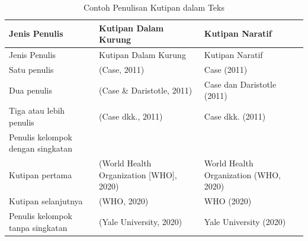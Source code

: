 \documentclass[
  indonesian,
  letterpaper,
]{scrbook}
\begin{document}
\begin{longtable}[]{@{}
  >{\raggedright\arraybackslash}p{}
  >{\raggedright\arraybackslash}p{}
  >{\raggedright\arraybackslash}p{}@{}}
\caption{Contoh Penulisan Kutipan dalam
Teks}\label{tbl-kutipanteks}\tabularnewline
\toprule\noalign{}
\begin{minipage}[b]{\linewidth}\raggedright
Jenis Penulis
\end{minipage} & \begin{minipage}[b]{\linewidth}\raggedright
Kutipan Dalam Kurung
\end{minipage} & \begin{minipage}[b]{\linewidth}\raggedright
Kutipan Naratif
\end{minipage} \\
\midrule\noalign{}
\endfirsthead
\toprule\noalign{}
\begin{minipage}[b]{\linewidth}\raggedright
Jenis Penulis
\end{minipage} & \begin{minipage}[b]{\linewidth}\raggedright
Kutipan Dalam Kurung
\end{minipage} & \begin{minipage}[b]{\linewidth}\raggedright
Kutipan Naratif
\end{minipage} \\
\midrule\noalign{}
\endhead
\bottomrule\noalign{}
\endlastfoot
Satu penulis & (Case, 2011) & Case (2011) \\
Dua penulis & (Case \& Daristotle, 2011) & Case dan Daristotle (2011) \\
Tiga atau lebih penulis & (Case dkk., 2011) & Case dkk. (2011) \\
Penulis kelompok dengan singkatan & & \\
Kutipan pertama & (World Health Organization {[}WHO{]}, 2020) & World
Health Organization (WHO, 2020) \\
Kutipan selanjutnya & (WHO, 2020) & WHO (2020) \\
Penulis kelompok tanpa singkatan & (Yale University, 2020) & Yale
University (2020) \\
\end{longtable}
\end{document}
